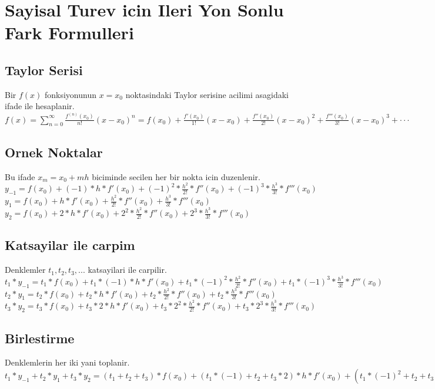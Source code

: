\documentclass{article}
\begin{document}
\setlength\parindent{0pt}
\section{Sayisal Turev icin Ileri Yon Sonlu Fark Formulleri}
\subsection{Taylor Serisi}
Bir $f(x)$ fonksiyonunun $x=x_{0}$ noktasindaki Taylor serisine acilimi asagidaki ifade ile hesaplanir.\\
$\displaystyle f(x)=\sum_{n=0}^{\infty}\frac{f^{(n)}(x_{0})}{n!}(x-x_{0})^n = f(x_{0}) + \frac{f'(x_{0})}{1!}(x-x_{0}) + \frac{f''(x_{0})}{2!}(x-x_{0})^2 + \frac{f'''(x_{0})}{3!}(x-x_{0})^3 + \cdot\cdot\cdot$
\subsection{Ornek Noktalar}
Bu ifade $x_{m}=x_{0}+mh$ biciminde secilen her bir nokta icin duzenlenir.\\
$\displaystyle y_{-1}=f(x_{0})+(-1)*h*f'(x_{0})+(-1)^{2}*\frac{h^{2}}{2!}*f''(x_{0})+(-1)^{3}*\frac{h^{3}}{3!}*f'''(x_{0})$\\
$\displaystyle y_{1}=f(x_{0})+h*f'(x_{0})+\frac{h^{2}}{2!}*f''(x_{0})+\frac{h^{3}}{3!}*f'''(x_{0})$\\
$\displaystyle y_{2}=f(x_{0})+2*h*f'(x_{0})+2^{2}*\frac{h^{2}}{2!}*f''(x_{0})+2^{3}*\frac{h^{3}}{3!}*f'''(x_{0})$\\
\subsection{Katsayilar ile carpim}
Denklemler $t_{1}, t_{2}, t_{3}, ...$ katsayilari ile carpilir.\\
$\displaystyle t_{1}*y_{-1}=t_{1}*f(x_{0})+t_{1}*(-1)*h*f'(x_{0})+t_{1}*(-1)^{2}*\frac{h^{2}}{2!}*f''(x_{0})+t_{1}*(-1)^{3}*\frac{h^{3}}{3!}*f'''(x_{0})$\\
$\displaystyle t_{2}*y_{1}=t_{2}*f(x_{0})+t_{2}*h*f'(x_{0})+t_{2}*\frac{h^{2}}{2!}*f''(x_{0})+t_{2}*\frac{h^{3}}{3!}*f'''(x_{0})$\\
$\displaystyle t_{3}*y_{2}=t_{3}*f(x_{0})+t_{3}*2*h*f'(x_{0})+t_{3}*2^{2}*\frac{h^{2}}{2!}*f''(x_{0})+t_{3}*2^{3}*\frac{h^{3}}{3!}*f'''(x_{0})$\\
\subsection{Birlestirme}
Denklemlerin her iki yani toplanir.\\
$\displaystyle t_{1}*y_{-1}+t_{2}*y_{1}+t_{3}*y_{2}=(t_{1}+t_{2}+t_{3})*f(x_{0})+(t_{1}*(-1)+t_{2}+t_{3}*2)*h*f'(x_{0})+(t_{1}*(-1)^{2}+t_{2}+t_{3}*2^{2})*\frac{h^{2}}{2!}*f''(x_{0})+(t_{1}*(-1)^{3}+t_{2}+t_{3}*2^{3})*\frac{h^{3}}{3!}*f'''(x_{0})$
\end{document}
